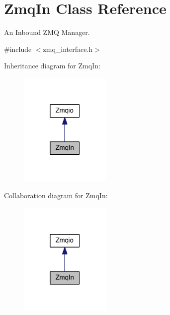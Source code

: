 \hypertarget{classZmqIn}{}\section{Zmq\+In Class Reference}
\label{classZmqIn}


An Inbound Z\+MQ Manager.  




{\ttfamily \#include $<$zmq\+\_\+interface.\+h$>$}



Inheritance diagram for Zmq\+In\+:\nopagebreak
\begin{figure}[H]
\begin{center}
\leavevmode
\includegraphics[width=124pt]{classZmqIn__inherit__graph}
\end{center}
\end{figure}


Collaboration diagram for Zmq\+In\+:\nopagebreak
\begin{figure}[H]
\begin{center}
\leavevmode
\includegraphics[width=124pt]{classZmqIn__coll__graph}
\end{center}
\end{figure}
